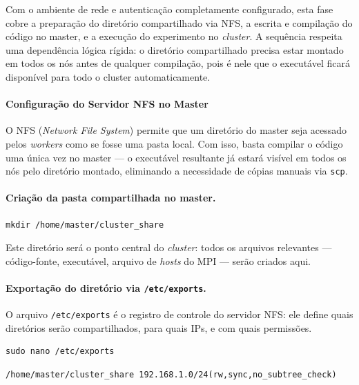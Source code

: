 \documentclass[
	12pt,
	oneside,
	a4paper,
	chapter=TITLE,
	section=TITLE,
	english,
	brazil,
	sumario=tradicional
]{abntex2}
\begin{document}
Com o ambiente de rede e autenticação completamente configurado,
esta fase cobre a preparação do diretório compartilhado via NFS,
a escrita e compilação do código no master, e a execução do
experimento no \textit{cluster}. A sequência respeita uma dependência
lógica rígida: o diretório compartilhado precisa estar montado
em todos os nós antes de qualquer compilação, pois é nele
que o executável ficará disponível para todo o cluster
automaticamente.
 
\paragraph{Configuração do Servidor NFS no Master}

O NFS (\textit{Network File System}) permite que um diretório do
master seja acessado pelos \textit{workers} como se fosse uma
pasta local. Com isso, basta compilar o código uma única vez
no master — o executável resultante já estará visível em todos
os nós pelo diretório montado, eliminando a necessidade de cópias
manuais via \texttt{scp}.
 
\paragraph{Criação da pasta compartilhada no master.}
 
\begin{lstlisting}[style=bash, caption={Criação do diretório a ser compartilhado via NFS}]
mkdir /home/master/cluster_share
\end{lstlisting}
 
Este diretório será o ponto central do \textit{cluster}: todos os arquivos
relevantes — código-fonte, executável, arquivo de \textit{hosts}
do MPI — serão criados aqui.
 
\paragraph{Exportação do diretório via \texttt{/etc/exports}.}
 
O arquivo \texttt{/etc/exports} é o registro de controle do
servidor NFS: ele define quais diretórios serão compartilhados,
para quais IPs, e com quais permissões.
 
\begin{lstlisting}[style=bash, caption={Edição do arquivo de exportações NFS.}]
sudo nano /etc/exports
\end{lstlisting}
 
\begin{lstlisting}[style=bash, caption={Conteúdo adicionado ao \texttt{/etc/exports}.}]
/home/master/cluster_share 192.168.1.0/24(rw,sync,no_subtree_check)
\end{lstlisting}
 
\end{document}
